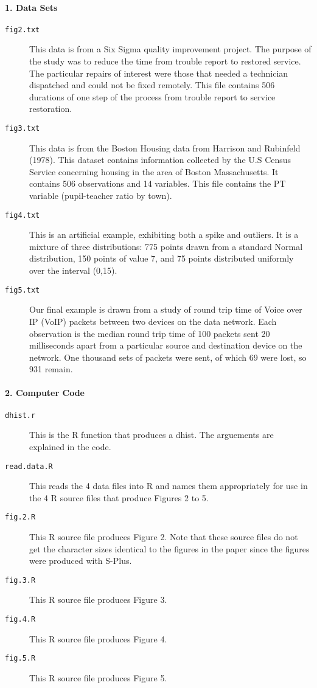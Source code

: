 \documentclass{jcgsf}
\begin{document}
\paragraph{1. Data Sets}
\begin{description}
\item[\tt fig2.txt] This data is from
a Six Sigma quality improvement project.
The purpose of the study was to reduce the time
from trouble report to restored service.
The particular repairs of interest were those
that needed a technician dispatched
and could not be fixed remotely.  This file contains 506 
durations of one step of the process from
trouble report to service restoration.

\item[\tt fig3.txt] This data is from the Boston Housing data from
Harrison and Rubinfeld (1978).  This dataset contains information
collected by the U.S Census Service concerning housing in the
area of Boston Massachusetts.  It contains
506 observations and 14 variables. This file contains the 
PT variable (pupil-teacher ratio by town).

\item[\tt fig4.txt] This is an artificial example, 
exhibiting both a spike and outliers.
It is a mixture of three
distributions:   775 points drawn from a standard Normal distribution,
150 points of value 7, and 75 points distributed uniformly over the interval
(0,15).   

\item[\tt fig5.txt] Our final example is drawn from
a study of round trip time of Voice over IP (VoIP) packets between two
devices on the data network.  Each observation is the median round
trip time of 100 packets sent 20 milliseconds apart from a particular
source and destination device on the network.  One thousand sets of
packets were sent,
of which 69 were lost, so 931 remain.
\end{description}

\paragraph{2. Computer Code}
\begin{description}
\item[\tt dhist.r] This is the R function that produces a dhist.  The 
arguements are explained in the code.
\item[\tt read.data.R] This reads the 4 data files into R and names them
appropriately for use in the 4 R source files that produce Figures 2 to 5.
\item[\tt fig.2.R] This R source file produces Figure 2. Note that these
source files do not get the character sizes identical to the figures
in the paper since the figures were produced with S-Plus.
\item[\tt fig.3.R] This R source file produces Figure 3.
\item[\tt fig.4.R] This R source file produces Figure 4.
\item[\tt fig.5.R] This R source file produces Figure 5.
\end{description}
\end{document}
